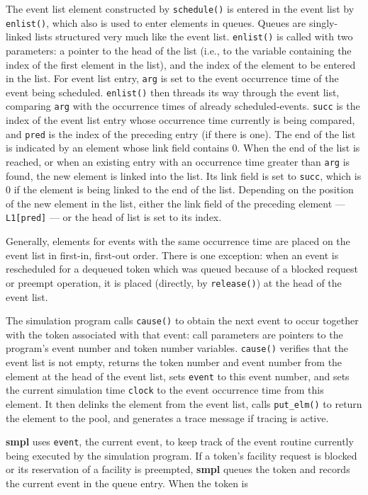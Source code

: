 The event list element constructed by \texttt{schedule()} is entered in the event
list by \texttt{enlist()}, which also is used to enter elements in queues. Queues are
singly-linked lists structured very much like the event list. \texttt{enlist()} is
called with two parameters: a pointer to the head of the list (i.e., to the
variable containing the index of the first element in the list), and the index
of the element to be entered in the list. For event list entry, \texttt{arg} is set to the
event occurrence time of the event being scheduled. \texttt{enlist()} then threads
its way through the event list, comparing \texttt{arg} with the occurrence times of
already scheduled-events. \texttt{succ} is the index of the event list entry whose
occurrence time currently is being compared, and \texttt{pred} is the index of the
preceding entry (if there is one). The end of the list is indicated by an
element whose link field contains 0. When the end of the list is reached, or
when an existing entry with an occurrence time greater than \texttt{arg} is found, the
new element is linked into the list. Its link field is set to \texttt{succ}, which is 0 if
the element is being linked to the end of the list. Depending on the position
of the new element in the list, either the link field of the preceding element
--- \texttt{L1[pred]} --- or the head of list is set to its index.

Generally, elements for events with the same occurrence time are placed
on the event list in first-in, first-out order. There is one exception: when an
event is rescheduled for a dequeued token which was queued because of a
blocked request or preempt operation, it is placed (directly, by \texttt{release()})
at the head of the event list.

The simulation program calls \texttt{cause()} to obtain the next event to occur
together with the token associated with that event: call parameters are
pointers to the program's event number and token number variables.
\texttt{cause()} verifies that the event list is not empty, returns the token number
and event number from the element at the head of the event list, sets \texttt{event}
to this event number, and sets the current simulation time \texttt{clock} to the event
occurrence time from this element. It then delinks the element from the event
list, calls \texttt{put\_elm()} to return the element to the pool, and generates a trace
message if tracing is active.

\textbf{smpl} uses \texttt{event}, the current event, to keep track of the event routine
currently being executed by the simulation program. If a token's facility
request is blocked or its reservation of a facility is preempted, \textbf{smpl} queues
the token and records the current event in the queue entry. When the token is

